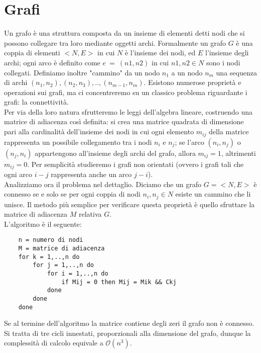 \section{Grafi}
Un grafo è una struttura composta da un insieme di elementi detti nodi che si possono collegare tra loro mediante oggetti archi. Formalmente un grafo $G$ è una coppia di elementi $<N, E>$ in cui $N$ è l'insieme dei nodi, ed $E$ l'insieme degli archi; ogni arco è definito come $e \ = \ (n1,n2)$ in cui $n1,n2 \in N$ sono i nodi collegati. Definiamo inoltre "cammino" da un nodo $n_1$ a un nodo $n_m$ una sequenza di archi $(n_1,n_2),(n_2,n_3),..,(n_{m-1}, n_m)$.
\newpage
\noindent Esistono numerose proprietà e operazioni sui grafi, ma ci concentreremo su un classico problema riguardante i grafi: la connettività.\\
Per via della loro natura sfrutteremo le leggi dell'algebra lineare, costruendo una matrice di adiacenza così definita: si crea una matrice quadrata di dimensione pari alla cardinalità dell'insieme dei nodi in cui ogni elemento $m_{ij}$ della matrice rappresenta un possibile collegamento tra i nodi $n_i$ e $n_j$; se l'arco $(n_i,n_j)$ o $(n_j,n_i)$ appartengono all'insieme degli archi del grafo, allora $m_{ij} = 1$, altrimenti $m_{ij} = 0$. Per semplicità studieremo i grafi non orientati (ovvero i grafi tali che ogni arco $i-j$ rappresenta anche un arco $j-i$).\\
Analizziamo ora il problema nel dettaglio. Diciamo che un grafo $G = <N, E>$ è connesso se e solo se per ogni coppia di nodi $n_i, n_j \in N$ esiste un cammino che li unisce. Il metodo più semplice per verificare questa proprietà è quello sfruttare la matrice di adiacenza $M$ relativa $G$. \\
L'algoritmo è il seguente:
\begin{verbatim}
    n = numero di nodi
    M = matrice di adiacenza
    for k = 1,..,n do
        for j = 1,..,n do
            for i = 1,..,n do
                if Mij = 0 then Mij = Mik && Ckj
            done
        done
    done
\end{verbatim}
\newpage
\noindent Se al termine dell'algoritmo la matrice contiene degli zeri il grafo non è connesso.\\
Si tratta di tre cicli innestati, proporzionali alla dimensione del grafo, dunque la complessità di calcolo equivale a $\mathcal{O}(n^3)$.\\
